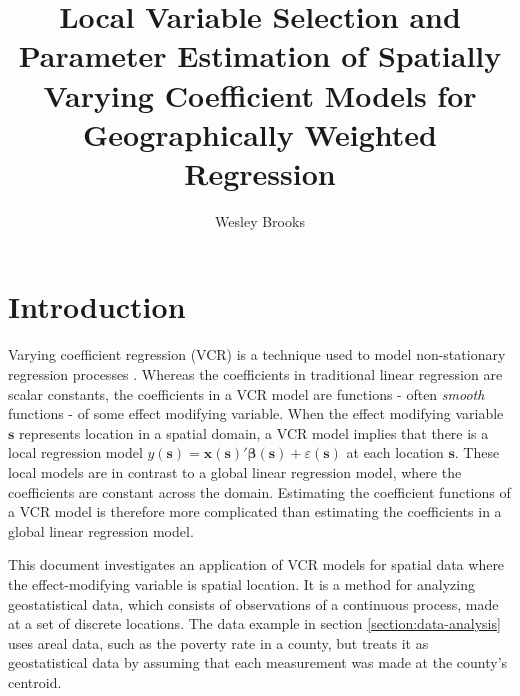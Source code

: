 \documentclass[authoryear, review, 11pt]{elsarticle}
\title{Local Variable Selection and Parameter Estimation of Spatially Varying Coefficient Models for Geographically Weighted Regression}
\author{Wesley Brooks}
\date{}                                           %
\begin{document}
\maketitle




\section{Introduction}
	Varying coefficient regression (VCR) is a technique used to model non-stationary regression processes \citep{Hastie:1993a}. Whereas the coefficients in traditional linear regression are scalar constants, the coefficients in a VCR model are functions - often \emph{smooth} functions - of some effect modifying variable. When the effect modifying variable $\bm{s}$ represents location in a spatial domain, a VCR model implies that there is a local regression model $y(\bm{s}) = \bm{x}(\bm{s})' \bm{\beta}(\bm{s}) + \varepsilon(\bm{s})$ at each location $\bm{s}$. These local models are in contrast to a global linear regression model, where the coefficients are constant across the domain. Estimating the coefficient functions of a VCR model is therefore more complicated than estimating the coefficients in a global linear regression model.
	
	This document investigates an application of VCR models for spatial data where the effect-modifying variable is spatial location. It is a method for analyzing geostatistical data, which consists of observations of a continuous process, made at a set of discrete locations. The data example in section \ref{section:data-analysis} uses areal data, such as the poverty rate in a county, but treats it as geostatistical data by assuming that each measurement was made at the county's centroid.
	
\end{document}
